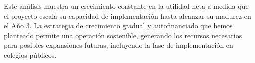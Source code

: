 Este análisis muestra un crecimiento constante en la utilidad neta a medida que 
el proyecto escala su capacidad de implementación hasta alcanzar su madurez en 
el Año 3. La estrategia de crecimiento gradual y autofinanciado que hemos 
planteado permite una operación sostenible, generando los recursos necesarios 
para posibles expansiones futuras, incluyendo la fase de implementación en 
colegios públicos.
